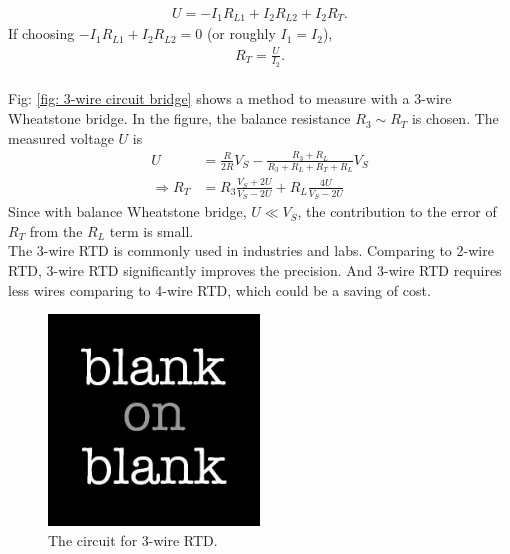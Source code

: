 \begin{align}
U = -I_1 R_{L1}+I_2 R_{L2} + I_2 R_T.
\end{align} 
If choosing $-I_1 R_{L1}+I_2 R_{L2} =0 $ (or roughly $I_1=I_2$), 
\begin{align}
R_T = \frac{U}{I_2}.
\end{align}
\\
Fig: \ref{fig: 3-wire circuit bridge} shows a method to measure with a 3-wire Wheatstone bridge. In the figure, the balance resistance $R_3 \sim R_T$ is chosen. The measured voltage $U$ is
\begin{align}
U & = \frac{R}{2R}V_{S}-\frac{R_3+R_L}{R_3+R_L+R_T+R_L}V_S \\
\Rightarrow R_T & = R_3\frac{V_S+2U}{V_S-2U} + R_{L}\frac{4 U}{V_S-2U}
\end{align}
Since with balance Wheatstone bridge, $U \ll V_S$, the contribution to the error of $R_T$ from the $R_L$ term is small.
\\ 
The 3-wire RTD is commonly used in industries and labs. Comparing to 2-wire RTD, 3-wire RTD significantly improves the precision. And 3-wire RTD requires less wires comparing to 4-wire RTD, which could be a saving of cost. 
\begin{figure}[h!]
  \centering
  \includegraphics[width=0.5\textwidth]
  {blank.jpg}
  \caption{The circuit for 3-wire RTD.}
  \label{fig: 3-wire circuit simple}
\end{figure}

